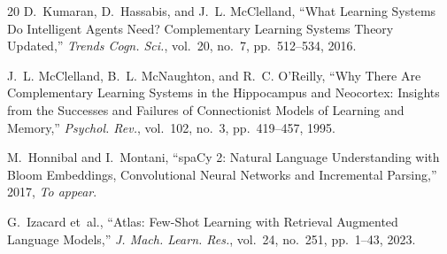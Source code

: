 \documentclass[conference]{IEEEtran}
\begin{document}
\begin{thebibliography}{20}
D.~Kumaran, D.~Hassabis, and J.~L. McClelland,
``What Learning Systems Do Intelligent Agents Need?
Complementary Learning Systems Theory Updated,''
\emph{Trends Cogn. Sci.}, vol.~20, no.~7, pp.~512--534, 2016.

J.~L. McClelland, B.~L. McNaughton, and R.~C. O'Reilly,
``Why There Are Complementary Learning Systems in the Hippocampus and
Neocortex: Insights from the Successes and Failures of Connectionist Models
of Learning and Memory,''
\emph{Psychol. Rev.}, vol.~102, no.~3, pp.~419--457, 1995.

M.~Honnibal and I.~Montani,
``spaCy 2: Natural Language Understanding with Bloom Embeddings, Convolutional
Neural Networks and Incremental Parsing,''
2017, \emph{To appear}.

G.~Izacard et~al.,
``Atlas: Few-Shot Learning with Retrieval Augmented Language Models,''
\emph{J. Mach. Learn. Res.}, vol.~24, no.~251, pp.~1--43, 2023.

\end{thebibliography}
\end{document}

